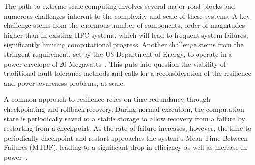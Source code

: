 
The path to extreme scale computing involves several major road blocks and numerous challenges inherent to the complexity and scale of these systems. A key challenge stems from the enormous number of components, order of magnitudes higher than in existing HPC systems, which will lead to frequent system failures, significantly limiting computational progress. Another challenge stems from the stringent requirement, set by the US Department of Energy, to operate in a power envelope of 20 Megawatts~\cite{Bergman08exascalecomputing}. This puts into question the viability of traditional fault-tolerance methods and calls for a reconsideration of the resilience and power-awareness problems, at scale.

A common approach to resilience relies on time redundancy through checkpointing and rollback recovery. During normal execution, the computation state is periodically saved to a stable storage to allow recovery from a failure by restarting from a checkpoint. As the rate of failure increases, however, the time to periodically checkpoint and restart approaches the system's Mean Time Between Failures (MTBF), leading to a significant drop in efficiency as well as increase in power~\cite{1350776}.%

